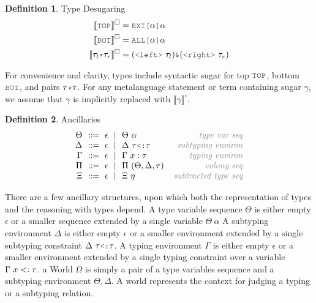 \documentclass[acmsmall]{acmart}
\theoremstyle{definition}
\newtheorem{definition}{Definition}[section]
\begin{document}
\begin{definition} 
  \label{def:type_desugaring}
  Type Desugaring 
  \hfill 
  \boxed{\llbracket \gamma \rrbracket^\square = \tau}
  \\
  \begin{align*}
    \llbracket \J{TOP} \rrbracket^\square &= \J{EXI[} \alpha \J{]} \alpha
    \\
    \llbracket \J{BOT} \rrbracket^\square &= \J{ALL[} \alpha \J{]} \alpha
    \\
    \llbracket \tau_l \J{*} \tau_r \rrbracket^\square &= (\J{<left>}\ \tau_l)  \J{\&} (\J{<right>}\ \tau_r)
  \end{align*}
\end{definition} 

\noindent
For convenience and clarity, types include syntactic sugar for top $\J{TOP}$, 
bottom $\J{BOT}$, and pairs $\tau \J{*} \tau$.
For any metalanguage statement or term containing sugar $\gamma$, we assume that $\gamma$ is implicitly replaced with $\llbracket \gamma \rrbracket^\square$.


\begin{definition} Ancillaries 
  \label{def:type_ancillaries}
  \[\begin{array}[t]{r@{}l@{}r}
    \nonterm{\Theta} & \is \epsilon \sep \Theta\ \alpha 
    & \com{type var seq}
    \\
    \nonterm{\Delta} & \is \epsilon \sep \Delta \  \tau \J{<:} \tau
    & \com{subtyping environ}
    \\
    \nonterm{\Gamma} & \is \epsilon \sep \Gamma\ x \hastype \tau
    & \com{typing environ}
    \\
    \nonterm{\Pi} & \is \epsilon \sep \Pi\ (\Theta, \Delta, \tau) 
    & \com{colony seq}
    \\
    \nonterm{\Xi} & \is \epsilon \sep \Xi\ \eta 
    & \com{subtracted type seq}
  \end{array}\]
\end{definition}


There are a few ancillary structures, upon which both the representation of types and the reasoning with types depend.
A type variable sequence $\Theta$ is either empty $\epsilon$ or a smaller sequence extended by a single variable $\Theta\ \alpha$
A subtyping environment $\Delta$ is either empty $\epsilon$ or a smaller environment extended by a single
subtyping constraint $\Delta \  \tau \J{<:} \tau$.
A typing environment $\Gamma$ is either empty $\epsilon$ or a smaller environment extended by a single
typing constraint over a variable $\Gamma\ x <: \tau$.
a World $\Omega$ is simply a pair of a type variables sequence and a subtyping environment $\Theta, \Delta$.
A world represents the context for judging a typing or a subtyping relation.
\end{document}
